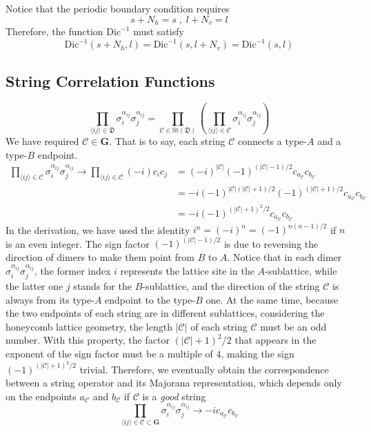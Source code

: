 \documentclass[12font]{article}
\theoremstyle{definition}
\newcommand{\anglelr}[1]{\langle #1 \rangle}
\newcommand{\lr}[1]{\left(  #1  \right)}
\newcommand{\abs}[1]{\left|  #1  \right|}
\newcommand{\mrm}[1]{\mathrm{#1}}
\newcommand{\bo}[1]{\mathbf{#1}}
\newcommand{\dimer}[2]{\sigma_{#1}^{\alpha_{#1#2}}\sigma_{#2}^{\alpha_{#1#2}}}
\begin{document}
Notice that the periodic boundary condition requires
\[
    s + N_h = s \;,\; l + N_v = l
\]
Therefore, the function $\mrm{Dic}^{-1}$ must satisfy
\[
    \mrm{Dic}^{-1}(s+N_h,l) = \mrm{Dic}^{-1}(s,l+N_v) = \mrm{Dic}^{-1}(s,l)
\]

\subsection{String Correlation Functions}
\[
\prod_{\anglelr{ij}\in\mathfrak{D}}
    \dimer{i}{j}
=
\prod_{\mathcal{C} \in \mrm{St}(\mathfrak{D})}
\lr{
    \prod_{\anglelr{ij}\in\mathcal{C}}
    \dimer{i}{j}
}
\]
We have required $\mathcal{C} \in \bo{G}$. That is to say, each string $\mathcal{C}$ connects a type-$A$ and a type-$B$ endpoint.
\begin{align*}
    \prod_{\anglelr{ij}\in\mathcal{C}}
    \dimer{i}{j}
    \to
    \prod_{\anglelr{ij}\in\mathcal{C}}
        (-i) c_ic_j 
    &=
    (-i)^{\abs{\mathcal{C}}} (-1)^{(\abs{\mathcal{C}} - 1)/2}c_{a_{\mathcal{C}}}c_{b_{\mathcal{C}}} \\
    &=
    -i
    (-1)^{\abs{\mathcal{C}}(\abs{\mathcal{C}}+1)/2} (-1)^{(\abs{\mathcal{C}} + 1)/2}c_{a_{\mathcal{C}}}c_{b_{\mathcal{C}}} \\
    &= -i (-1)^{(\abs{\mathcal{C}} + 1)^2/2} c_{a_{\mathcal{C}}}c_{b_{\mathcal{C}}}
\end{align*}
In the derivation, we have used the identity $i^{n} = (-i)^n = (-1)^{n(n-1)/2}$ if $n$ is an even integer. The sign factor $(-1)^{(\abs{\mathcal{C}}-1)/2}$ is due to reversing the direction of dimers to make them point from $B$ to $A$. Notice that in each dimer $\dimer{i}{j}$, the former index $i$ represents the lattice site in the $A$-sublattice, while the latter one $j$ stands for the $B$-sublattice, and the direction of the string $\mathcal{C}$ is always from its type-$A$ endpoint to the type-$B$ one. At the same time, because the two endpoints of each string are in different sublattices, considering the honeycomb lattice geometry, the length $\abs{\mathcal{C}}$ of each string $\mathcal{C}$ must be an odd number. With this property, the factor $(\abs{\mathcal{C}} + 1)^2/2$ that appears in the exponent of the sign factor must be a multiple of $4$, making the sign $(-1)^{(\abs{\mathcal{C}} + 1)^2/2}$ trivial. Therefore, we eventually obtain the correspondence between a string operator and its Majorana representation, which depends only on the endpoints $a_\mathcal{C}$ and $b_\mathcal{C}$ if $\mathcal{C}$ is a \textit{good} string
\begin{equation}
    \prod_{\anglelr{ij}\in\mathcal{C} \subset \bo{G}}
    \dimer{i}{j} 
    \to 
    -i c_{a_{\mathcal{C}}}c_{b_{\mathcal{C}}}
\end{equation}
\end{document}
